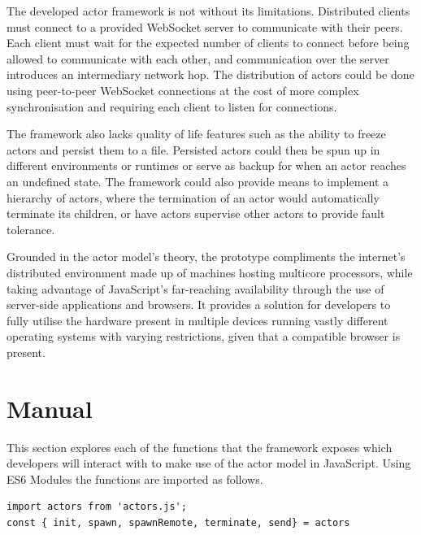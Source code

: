 \documentclass[oneside]{um-fict}
\begin{document}
The developed actor framework is not without its limitations. Distributed clients must connect to a provided WebSocket server to communicate with their peers. Each client must wait for the expected number of clients to connect before being allowed to communicate with each other, and communication over the server introduces an intermediary network hop. The distribution of actors could be done using peer-to-peer WebSocket connections at the cost of more complex synchronisation and requiring each client to listen for connections.

The framework also lacks quality of life features such as the ability to freeze actors and persist them to a file. Persisted actors could then be spun up in different environments or runtimes or serve as backup for when an actor reaches an undefined state. The framework could also provide means to implement a hierarchy of actors, where the termination of an actor would automatically terminate its children, or have actors supervise other actors to provide fault tolerance.

Grounded in the actor model's theory, the prototype compliments the internet's distributed environment made up of machines hosting multicore processors, while taking advantage of JavaScript's far-reaching availability through the use of server-side applications and browsers. It provides a solution for developers to fully utilise the hardware present in multiple devices running vastly different operating systems with varying restrictions, given that a compatible browser is present.

{%
    \if@openright\cleardoublepage\else\clearpage\fi
    {\scriptsize}
	\printindex
}

\appendix
\chapter{Manual}\label{appendix:manual}
This section explores each of the functions that the framework exposes which developers will interact with to make use of the actor model in JavaScript. Using ES6 Modules the functions are imported as follows.
\begin{lstlisting}
import actors from 'actors.js';
const { init, spawn, spawnRemote, terminate, send} = actors
\end{lstlisting}
\end{document}
